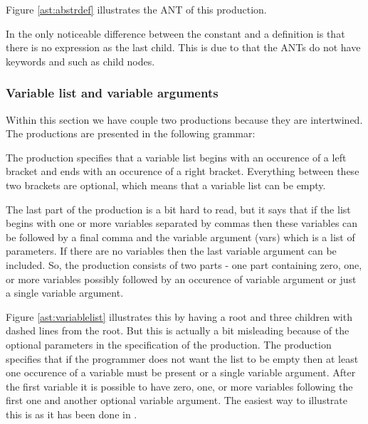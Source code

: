 Figure \ref{ast:abstrdef} illustrates the ANT of this production.



In  the only noticeable difference between the constant and 
a definition is that there is no expression as the last child.  This is due to
that the ANTs do not have keywords and such as child nodes.


\subsubsection{Variable list and variable arguments}
Within this section we have couple two productions because they are intertwined. 
The productions are presented in the following grammar:

\begin{ebnf}
\end{ebnf}

The production specifies that a variable list begins with an occurence of a left
bracket and ends with an occurence of a right bracket. Everything between these
two brackets are optional, which means that a variable list can be empty.

The last part of the production is a bit hard to read, but it says that if the
list begins with one or more variables separated by commas then these variables
can be followed by a final comma and the variable argument (vars) which is a
list of parameters. If there are no variables then the last variable argument
can be included. So, the production consists of two parts - one part containing
zero, one, or more variables possibly followed by an occurence of variable
argument or just a single variable argument.



Figure \ref{ast:variablelist} illustrates this by having a root and three
children with dashed lines from the root. But this is actually a bit misleading
because of the optional parameters in the specification of the production. The
production specifies that if the programmer does not want the list to be empty
then at least one occurence of a variable must be present or a single variable
argument. After the first variable it is possible to have zero, one, or more
variables following the first one and another optional variable argument. The
easiest way to illustrate this is as it has been done in
.

